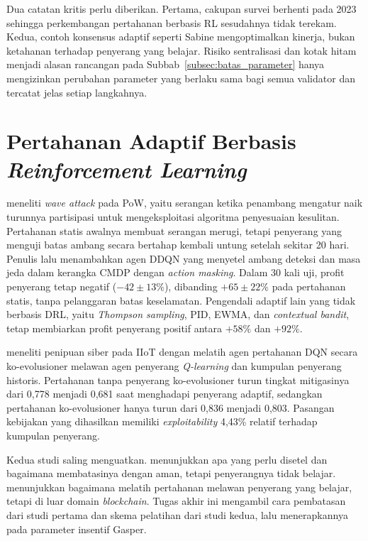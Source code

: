Dua catatan kritis perlu diberikan. Pertama, cakupan survei berhenti pada 2023 sehingga perkembangan pertahanan berbasis RL sesudahnya tidak terekam. Kedua, contoh konsensus adaptif seperti Sabine mengoptimalkan kinerja, bukan ketahanan terhadap penyerang yang belajar. Risiko sentralisasi dan kotak hitam menjadi alasan rancangan pada Subbab~\ref{subsec:batas_parameter} hanya mengizinkan perubahan parameter yang berlaku sama bagi semua validator dan tercatat jelas setiap langkahnya.

\section{Pertahanan Adaptif Berbasis \textit{Reinforcement Learning}}
\label{sec:pertahanan_adaptif}
\textcite{skowronski2026adaptive} meneliti \textit{wave attack} pada PoW, yaitu serangan ketika penambang mengatur naik turunnya partisipasi untuk mengeksploitasi algoritma penyesuaian kesulitan. Pertahanan statis awalnya membuat serangan merugi, tetapi penyerang yang menguji batas ambang secara bertahap kembali untung setelah sekitar 20 hari. Penulis lalu menambahkan agen DDQN yang menyetel ambang deteksi dan masa jeda dalam kerangka CMDP dengan \textit{action masking}. Dalam 30 kali uji, profit penyerang tetap negatif ($-42 \pm 13\%$), dibanding $+65 \pm 22\%$ pada pertahanan statis, tanpa pelanggaran batas keselamatan. Pengendali adaptif lain yang tidak berbasis DRL, yaitu \textit{Thompson sampling}, PID, EWMA, dan \textit{contextual bandit}, tetap membiarkan profit penyerang positif antara $+58\%$ dan $+92\%$.

\textcite{wushishi2026coadam} meneliti penipuan siber pada IIoT dengan melatih agen pertahanan DQN secara ko-evolusioner melawan agen penyerang \textit{Q-learning} dan kumpulan penyerang historis. Pertahanan tanpa penyerang ko-evolusioner turun tingkat mitigasinya dari 0,778 menjadi 0,681 saat menghadapi penyerang adaptif, sedangkan pertahanan ko-evolusioner hanya turun dari 0,836 menjadi 0,803. Pasangan kebijakan yang dihasilkan memiliki \textit{exploitability} 4,43\% relatif terhadap kumpulan penyerang.

Kedua studi saling menguatkan. \textcite{skowronski2026adaptive} menunjukkan apa yang perlu disetel dan bagaimana membatasinya dengan aman, tetapi penyerangnya tidak belajar. \textcite{wushishi2026coadam} menunjukkan bagaimana melatih pertahanan melawan penyerang yang belajar, tetapi di luar domain \textit{blockchain}. Tugas akhir ini mengambil cara pembatasan dari studi pertama dan skema pelatihan dari studi kedua, lalu menerapkannya pada parameter insentif Gasper.

